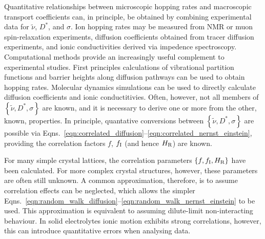 \documentclass[aps,prb,twocolumn,superscriptaddress,reprint]{revtex4-1}
\newcommand{\set}[1]{\left\{#1\right\}}
\newcommand{\hrpa}{{\widetilde{\nu}}}
\begin{document}
Quantitative relationships between microscopic hopping rates and macroscopic transport coefficients can, in principle, be obtained by combining experimental data for $\hrpa$, $D^*$, and $\sigma$. 
Ion hopping rates may be measured from NMR or muon spin-relaxation experiments,\cite{WilkeningEtAl_PhysRevLett2006, RuprechtEtAl_PhysChemChemPhys2012, Enciso-MaldonadoEtAl_ChemMater2015,Santibanez-MendietaEtAl_ChemMater2016, NozakiEtAl_SolStatIonics2014,AmoresEtAl_JMaterChemA2016} diffusion coefficients obtained from tracer diffusion experiments,\cite{BaylissEtAl_AdvEnergyMater2014} and ionic conductivities derived via impedence spectroscopy.\cite{ZeierEtAl_ACSApplMaterInt2014,Lopez-BermudezEtAl_2016} Computational methods provide an increasingly useful complement to experimental studies. 
First principles calculations of vibrational partition functions and barrier heights along diffusion pathways can be used to obtain hopping rates.\cite{VanDerVenEtAl_PhysRevB2001, MantinaEtAl_PhysRevLett2008} Molecular dynamics simulations can be used to directly calculate diffusion coefficients and ionic conductitivies.\cite{MorganAndMadden_JPhysCondensMat2012} Often, however, not all members of $\set{\hrpa,D^*,\sigma}$ are known, and it is necessary to derive one or more from the other, known, properties. In principle, quantative conversions between $\set{\hrpa,D^*,\sigma}$ are possible via Eqns.~\ref{eqn:correlated_diffusion}--\ref{eqn:correlated_nernst_einstein}, providing the correlation factors $f$, $f_{\mathrm{I}}$ (and hence $H_{\mathrm{R}}$) are known.

For many simple crystal lattices, the correlation parameters $\set{f, f_\m{I}, H_\m{R}}$ have been calculated.\cite{Friauf_JApplPhys1962,Murch_SolStatIonics1982} For more complex crystal structures, however, these parameters are often still unknown. A common approximation, therefore, is to assume correlation effects can be neglected, which allows the simpler Eqns.~\ref{eqn:random_walk_diffusion}--\ref{eqn:random_walk_nernst_einstein} to be used. This approximation is equivalent to assuming dilute-limit non-interacting behaviour. In solid electrolytes ionic motion exhibits strong correlations, however, this can introduce quantitative errors when analysing data.
\end{document}
